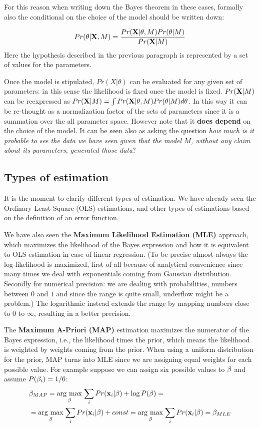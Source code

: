 For this reason when writing down the Bayes theorem in these cases, formally also the conditional on the choice of the model should be written down:

\begin{equation}
Pr(\theta|\mathrm{\mathbf{X}},M) = \frac{Pr(\mathrm{\mathbf{X}}|\theta,M)Pr(\theta|M)}{Pr(\mathrm{\mathbf{X}}|M)}
\end{equation}
Here the hypothesis described in the previous paragraph is represented by a set of values for the parameters.

Once the model is stipulated, $Pr(X|\theta)$ can be evaluated for any given set of parameters: in this sense the likelihood is fixed once the model is fixed.
$Pr(\mathrm{\mathbf{X}}|M)$ can be reexpressed as $Pr(\mathrm{\mathbf{X}}|M) =\int Pr(\mathrm{\mathbf{X}}|\theta,M)Pr(\theta|M)d\theta$. In this way it can be re-thought as a normalization factor of the sets of parameters since it is a summation over the all parameter space. However note that it \textbf{does depend} on the choice of the model. It can be seen also as asking the question \textit{how much is it probable to see the data we have seen given that the model $M$, without any claim about its parameters, generated those data}?

\subsection{Types of estimation}
\label{ssec:estimations}
It is the moment to clarify different types of estimation. We have already seen the Ordinary Least Square (OLS) estimations, and other types of estimations based on the definition of an error function.

We have also seen the \textbf{Maximum Likelihood Estimation (MLE)} approach, which maximizes the likelihood of the Bayes expression and how it is equivalent to OLS estimation in case of linear regression. (To be precise almost always the log-likelihood is maximized, first of all because of analytical convenience since many times we deal with exponentials coming from Gaussian distribution. Secondly for numerical precision: we are dealing with probabilities, numbers between $0$ and $1$ and since the range is quite small, underflow might be a problem.) The logarithmic instead extends the range by mapping numbers close to $0$ to $\infty$, resulting in a better precision.

The \textbf{Maximum A-Priori (MAP)} estimation maximizes the numerator of the Bayes expression, i.e., the likelihood times the prior, which means the likelihood is weighted by weights coming from the prior. When using a uniform distribution for the prior, MAP turns into MLE since we are assigning equal weights for each possible value. For example suppose we can assign six possible values to $\mathbf{\beta}$ and assume $P(\mathbf{\beta}_i)=1/6$:
\begin{equation}
\begin{aligned}
&\mathbf{\beta}_{MAP} = \underset{\mathbf{\beta}}{\operatorname{arg}\,\operatorname{max}}\;{\sum_i Pr(\mathbf{x}_i|\mathbf{\beta}) + \log P(\mathbf{\beta})} =
\\&= \underset{\mathbf{\beta}}{\operatorname{arg}\,\operatorname{max}}\;{\sum_i Pr(\mathbf{x}_i|\mathbf{\beta}) +const}=\underset{\mathbf{\beta}}{\operatorname{arg}\,\operatorname{max}}\;{\sum_i Pr(\mathbf{x}_i|\mathbf{\beta})} = \mathbf{\beta}_{MLE}
\end{aligned}
\end{equation}

